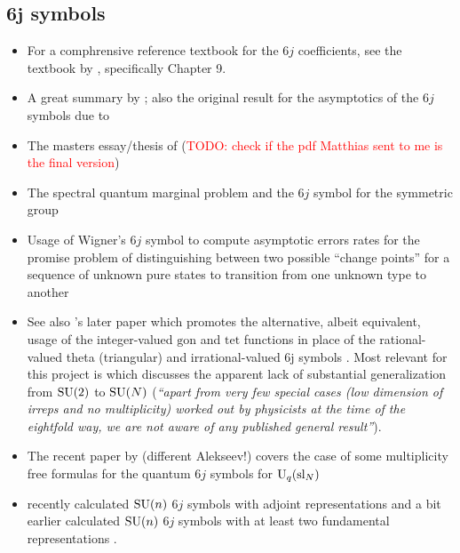 \documentclass[notitlepage, 10pt]{article}
\begin{document}
\subsection{\texorpdfstring{$\boldsymbol{6j}$}{6j} symbols}
\begin{itemize}
    \item For a comphrensive reference textbook for the $6j$ coefficients, see the textbook by \citeauthor{varshalovich1988quantum} \cite{varshalovich1988quantum}, specifically Chapter 9.
    \item A great summary by \citeauthor{roberts2002asymptotics} \cite{roberts2002asymptotics}; also the original result for the asymptotics of the $6j$ symbols due to  \citeauthor{roberts1999classical} \cite{roberts1999classical}
    \item The masters essay/thesis of \citeauthor{backens2010sixjsymbols} (\textcolor{red}{TODO: check if the pdf Matthias sent to me is the final version}) \cite{backens2010sixjsymbols}
    \item The spectral quantum marginal problem and the $6j$ symbol for the symmetric group \citeauthor{christandl2018recoupling} \cite{christandl2018recoupling}
    \item Usage of Wigner's $6j$ symbol to compute asymptotic errors rates for the promise problem of distinguishing between two possible ``change points'' for a sequence of unknown pure states to transition from one unknown type to another \cite{akimoto2011discrimination}
    \item See also 's later paper which promotes the alternative, albeit equivalent, usage of the integer-valued $\mathrm{gon}$ and $\mathrm{tet}$ functions in place of the rational-valued theta (triangular) and irrational-valued 6j symbols \cite{coquereaux2023integer}. Most relevant for this project is \cite[Section IV D]{coquereaux2023integer} which discusses the apparent lack of substantial generalization from $\operatorname{SU}(2)$ to $\operatorname{SU}(N)$ (\textit{``apart from very few special cases (low dimension of irreps and no multiplicity) worked out by physicists at the time of the eightfold way, we are not aware of any published general result''}).
    \item The recent paper by \citeauthor{alekseev2020multiplicity} (different Alekseev!) covers the case of some multiplicity free formulas for the quantum $6j$ symbols for $\operatorname{U}_q(\mathrm{sl}_{N})$ \cite{alekseev2020multiplicity}
    \item \citeauthor{keppeler2024wigner} recently calculated $\operatorname{SU}(n)$ $6j$ symbols with adjoint representations \cite{keppeler2024wigner} and a bit earlier \cite{alcock2023wigner} calculated $\operatorname{SU}(n)$ $6j$ symbols with at least two fundamental representations \cite{alcock2023wigner}.

\end{itemize}
\end{document}
